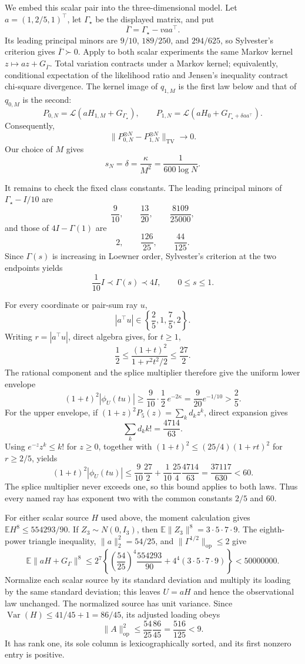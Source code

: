 We embed this scalar pair into the three-dimensional model.  Let \(a=(1,2/5,1)^\top\), let \(\Gamma_\star\) be the displayed matrix, and put
\[
 \overline\Gamma=\Gamma_\star-vaa^\top.
\]
Its leading principal minors are \(9/10\), \(189/250\), and \(294/625\), so Sylvester's criterion gives \(\overline\Gamma\succ0\).  Apply to both scalar experiments the same Markov kernel \(z\mapsto az+G_{\overline\Gamma}\).  Total variation contracts under a Markov kernel; equivalently, conditional expectation of the likelihood ratio and Jensen's inequality contract chi-square divergence.  The kernel image of \(q_{1,M}\) is the first law below and that of \(q_{0,M}\) is the second:
\[
 P_{0,N}=\mathcal L(aH_{1,M}+G_{\Gamma_\star}),\qquad
 P_{1,N}=\mathcal L(aH_0+G_{\Gamma_\star+\delta aa^\top}).
\]
Consequently,
\[
 \|P_{0,N}^{\otimes N}-P_{1,N}^{\otimes N}\|_{\mathrm{TV}}\longrightarrow0.
\]
Our choice of \(M\) gives
\[
 s_N=\delta=\frac{\kappa}{M^2}=\frac1{600\log N}.
\]

It remains to check the fixed class constants.  The leading principal minors of \(\Gamma_\star-I/10\) are
\[
 \frac9{10},\qquad \frac{13}{20},\qquad \frac{8109}{25000},
\]
and those of \(4I-\Gamma(1)\) are
\[
 2,\qquad \frac{126}{25},\qquad \frac{44}{125}.
\]
Since \(\Gamma(s)\) is increasing in Loewner order, Sylvester's criterion at the two endpoints yields
\[
 \frac1{10}I\prec\Gamma(s)\prec4I,
 \qquad 0\le s\le1.
\]

For every coordinate or pair-sum ray \(u\),
\[
 |a^\top u|\in\left\{\frac25,1,\frac75,2\right\}.
\]
Writing \(r=|a^\top u|\), direct algebra gives, for \(t\ge1\),
\[
 \frac12\le\frac{(1+t)^2}{1+r^2t^2/2}\le\frac{27}{2}.
\]
The rational component and the splice multiplier therefore give the uniform lower envelope
\[
 (1+t)^2|\phi_U(tu)|
 \ge\frac9{10}\cdot\frac12\,e^{-2\kappa}
 =\frac9{20}e^{-1/10}>\frac25.
\]
For the upper envelope, if \((1+z)^2P_5(z)=\sum_k d_kz^k\), direct expansion gives
\[
 \sum_kd_k k!=\frac{4714}{63}.
\]
Using \(e^{-z}z^k\le k!\) for \(z\ge0\), together with \((1+t)^2\le(25/4)(1+rt)^2\) for \(r\ge2/5\), yields
\[
 (1+t)^2|\phi_U(tu)|
 \le\frac9{10}\frac{27}{2}
   +\frac1{10}\frac{25}{4}\frac{4714}{63}
 =\frac{37117}{630}<60.
\]
The splice multiplier never exceeds one, so this bound applies to both laws.  Thus every named ray has exponent two with the common constants \(2/5\) and \(60\).

For either scalar source \(H\) used above, the moment calculation gives \(\mathbb EH^8\le554293/90\).  If \(Z_3\sim N(0,I_3)\), then \(\mathbb E\|Z_3\|^8=3\cdot5\cdot7\cdot9\).  The eighth-power triangle inequality, \(\|a\|_2^2=54/25\), and \(\|\Gamma^{1/2}\|_{\mathrm{op}}\le2\) give
\[
 \mathbb E\|aH+G_\Gamma\|^8
 \le2^7\left\{\left(\frac{54}{25}\right)^4\frac{554293}{90}
       +4^4(3\cdot5\cdot7\cdot9)\right\}
 <50000000.
\]
Normalize each scalar source by its standard deviation and multiply its loading by the same standard deviation; this leaves \(U=aH\) and hence the observational law unchanged.  The normalized source has unit variance.  Since \(\operatorname{Var}(H)\le41/45+1=86/45\), its adjusted loading obeys
\[
 \|A\|_{\mathrm{op}}^2
 \le\frac{54}{25}\frac{86}{45}
 =\frac{516}{125}<9.
\]
It has rank one, its sole column is lexicographically sorted, and its first nonzero entry is positive.


